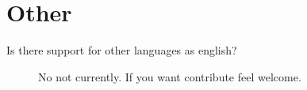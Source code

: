 \documentclass[a4paper, 12pt, openany]{scrbook}
\begin{document}
\section{Other}
\begin{description}
\item[Is there support for other languages as english?]  No not currently. If you want contribute feel welcome.
\end{description}

\clearpage %

% 
\printindex


\end{document}
